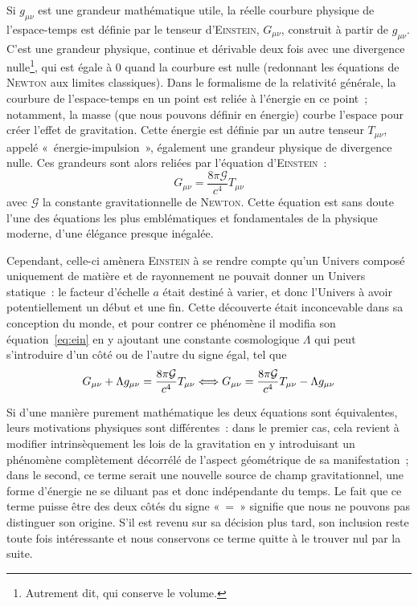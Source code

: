 \documentclass[../main/main.tex]{subfiles}
\begin{document}
Si $g_{\mu\nu}$ est une grandeur mathématique utile, la réelle courbure physique
de l'espace-temps est définie par le tenseur d'\textsc{Einstein}, $G_{\mu\nu}$,
construit à partir de $g_{\mu\nu}$. C'est une grandeur physique, continue et
dérivable deux fois avec une divergence nulle\footnote{Autrement dit, qui
conserve le volume.}, qui est égale à 0 quand la courbure est nulle (redonnant
les équations de \textsc{Newton} aux limites classiques). Dans le formalisme de
la relativité générale, la courbure de l'espace-temps en un point est reliée à
l'énergie en ce point~; notamment, la masse (que nous pouvons définir en
énergie) courbe l'espace pour créer l'effet de gravitation. Cette énergie est
définie par un autre tenseur $T_{\mu\nu}$, appelé «~énergie-impulsion~»,
également une grandeur physique de divergence nulle. Ces grandeurs sont alors
reliées par l'équation d'\textsc{Einstein}~:
\begin{equation}\label{eq:ein}
    G_{\mu\nu} = \frac{8\pi\mathcal{G}}{c^4}T_{\mu\nu}
\end{equation}
avec $\mathcal{G}$ la constante gravitationnelle de \textsc{Newton}. Cette
équation est sans doute l'une des équations les plus emblématiques et
fondamentales de la physique moderne, d'une élégance presque inégalée.

Cependant, celle-ci amènera \textsc{Einstein} à se rendre compte qu'un
Univers composé uniquement de matière et de rayonnement ne pouvait donner un
Univers statique~: le facteur d'échelle $a$ était destiné à varier, et donc
l'Univers à avoir potentiellement un début et une fin. Cette découverte était
inconcevable dans sa conception du monde, et pour contrer ce phénomène il
modifia son équation~\ref{eq:ein} en y ajoutant une constante cosmologique
$\Lambda$ qui peut s'introduire d'un côté ou de l'autre du signe égal, tel que
\begin{equation}\label{eq:einlamb}
    G_{\mu\nu} + \Lambda g_{\mu\nu} = \frac{8\pi\mathcal{G}}{c^4}T_{\mu\nu}
    \Longleftrightarrow
    G_{\mu\nu} = \frac{8\pi\mathcal{G}}{c^4}T_{\mu\nu} - \Lambda g_{\mu\nu} 
\end{equation}

Si d'une manière purement mathématique les deux équations sont équivalentes,
leurs motivations physiques sont différentes~: dans le premier cas, cela revient
à modifier intrinsèquement les lois de la gravitation en y introduisant un
phénomène complètement décorrélé de l'aspect géométrique de sa manifestation~;
dans le second, ce terme serait une nouvelle source de champ gravitationnel, une
forme d'énergie ne se diluant pas et donc indépendante du temps. Le fait que ce
terme puisse être des deux côtés du signe «~=~» signifie que nous ne pouvons pas
distinguer son origine. S'il est revenu sur sa décision plus tard, son inclusion
reste toute fois intéressante et nous conservons ce terme quitte à le trouver
nul par la suite.
\end{document}

